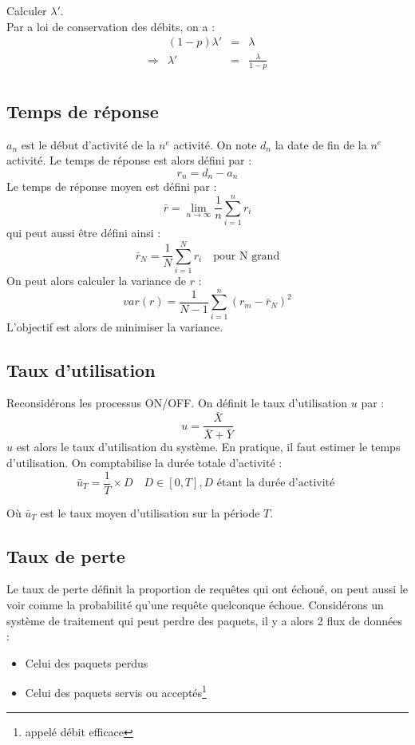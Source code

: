 \documentclass[a4paper, 11pt, fleqn]{article}
\newcommand{\inve}[1]{\frac{1}{#1}}
\begin{document}
Calculer $\lambda '$.\\

Par a loi de conservation des débits, on a : $$
\begin{array}{rccl}
	& ( 1 - p ) \lambda ' &=& \lambda \\
	\Longrightarrow & \lambda ' & =& \displaystyle \frac {\lambda}{1 - p} \\
\end{array} $$

\subsection{Temps de réponse}

$a_n$ est le début d'activité de la $n^e$ activité. On note $d_n$ la date de fin de la $n^e$
activité. Le temps de réponse est alors défini par : $$
r_n = d_n - a_n $$
Le temps de réponse moyen est défini par : $$
\bar r = \lim_{n \rightarrow \infty} \inve{n} \sum_{i=1}^n r_i$$
qui peut aussi être défini ainsi : $$
\bar r_N = \inve{N} \sum_{i=1}^N r_i \quad \mbox{pour N grand}$$
On peut alors calculer la variance de $r$ : $$
var (r) = \inve{N-1} \sum_{i=1}^n (r_m - \bar r_N) ^ 2$$
L'objectif est alors de minimiser la variance.

\subsection{Taux d'utilisation}

Reconsidérons les processus ON/OFF. On définit le taux d'utilisation $u$ par : $$
u = \frac{\bar X}{\bar X + \bar Y} $$
$u$ est alors le taux d'utilisation du système. En pratique, il faut estimer le temps d'utilisation.
On comptabilise la durée totale d'activité : $$
\bar u_T = \inve{T} \times D \quad D \in [0, T], D \mbox{ étant la durée d'activité } $$

Où $\bar u_T$ est le taux moyen d'utilisation sur la période $T$.

\subsection{Taux de perte}

Le taux de perte définit la proportion de requêtes qui ont échoué, on peut aussi le voir comme la
probabilité qu'une requête quelconque échoue. Considérons un système de traitement qui peut perdre
des paquets, il y a alors 2 flux de données : 
\begin{itemize}
	\item Celui des paquets perdus
	\item Celui des paquets servis ou acceptés\footnote{appelé débit efficace}
\end{itemize}
\end{document}
